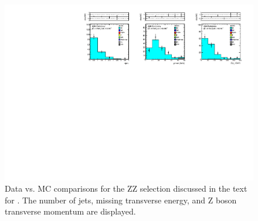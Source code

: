 \begin{figure}[tbh]
\begin{center}
\includegraphics[width=1\linewidth]{plots/ZZ_19fb.pdf}
\caption{\label{fig:zz}\protect 
Data vs. MC comparisons for the ZZ selection discussed in the text for \lumi.
The number of jets, missing transverse energy, and Z boson transverse momentum are displayed.
}
\end{center}
\end{figure}

